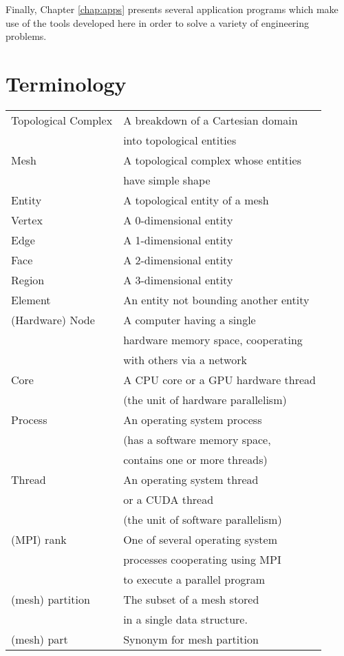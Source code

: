 Finally, Chapter \ref{chap:apps} presents several
application programs which make use of the tools developed
here in order to solve a variety of engineering problems.

\section{Terminology}

\begin{tabular}{l|l}
Topological Complex & A breakdown of a Cartesian domain \\
 & into topological entities \\
Mesh & A topological complex whose entities \\
 & have simple shape \\
Entity & A topological entity of a mesh \\
Vertex & A 0-dimensional entity \\
Edge & A 1-dimensional entity \\
Face & A 2-dimensional entity \\
Region & A 3-dimensional entity \\
Element & An entity not bounding another entity \\
(Hardware) Node & A computer having a single \\
 & hardware memory space, cooperating \\
 & with others via a network \\
Core & A CPU core or a GPU hardware thread \\
 & (the unit of hardware parallelism) \\
Process & An operating system process \\
 & (has a software memory space, \\
 & contains one or more threads) \\
Thread & An operating system thread \\
 & or a CUDA thread \\
 & (the unit of software parallelism) \\
(MPI) rank & One of several operating system \\
 & processes cooperating using MPI \\
 & to execute a parallel program \\
(mesh) partition & The subset of a mesh stored \\
 & in a single data structure. \\
(mesh) part & Synonym for mesh partition \\
\end{tabular}

